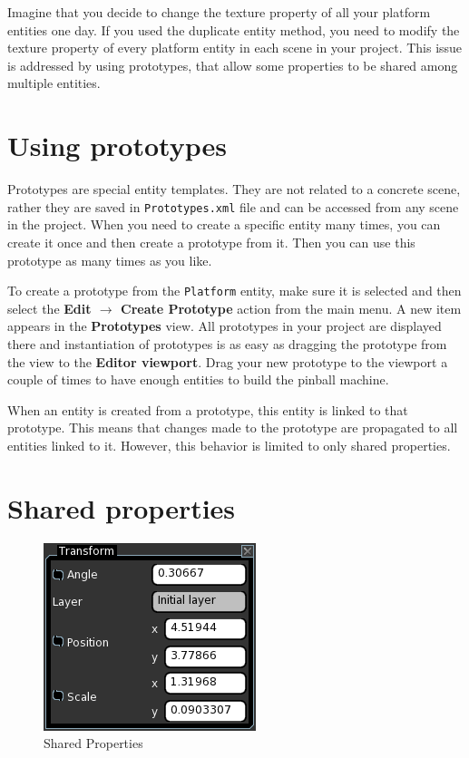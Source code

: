 \documentclass[a4paper,12pt]{article}
\begin{document}
Imagine that you decide to change the texture property of all your platform entities one day. If you used the duplicate entity method, you need to modify the texture property of every platform entity in each scene in your project. This issue is addressed by using prototypes, that allow some properties to be shared among multiple entities.

\section{Using prototypes}
Prototypes are special entity templates. They are not related to a concrete scene, rather they are saved in \texttt{Prototypes.xml} file and can be accessed from any scene in the project. When you need to create a specific entity many times, you can create it once and then create a prototype from it. Then you can use this prototype as many times as you like.

To create a prototype from the \texttt{Platform} entity, make sure it is selected and then select the \textbf{Edit $\to$ Create Prototype} action from the main menu. A new item appears in the \textbf{Prototypes} view. All prototypes in your project are displayed there and instantiation of prototypes is as easy as dragging the prototype from the view to the \textbf{Editor viewport}. Drag your new prototype to the viewport a couple of times to have enough entities to build the pinball machine.

When an entity is created from a prototype, this entity is linked to that prototype. This means that changes made to the prototype are propagated to all entities linked to it. However, this behavior is limited to only shared properties.

\section{Shared properties}

\begin{figure}
\vspace{-20pt}
\capstart
\begin{center}
  \includegraphics[scale=0.65]{SharedProperties}
 \end{center}
 \vspace{-20pt}
 \caption{Shared Properties}
 \label{fig:shared_properties}
 \vspace{-10pt}
\end{figure}
\end{document}
